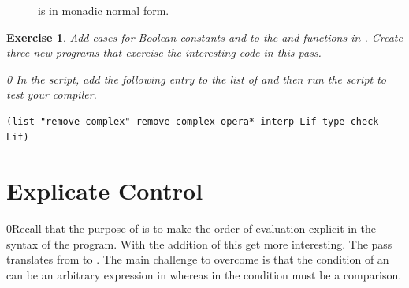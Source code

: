 \documentclass[7x10]{TimesAPriori_MIT}%
\newcommand{\gray}[1]{{\color{gray} #1}}
\def\racketEd{0}
\def\pythonEd{1}
\def\edition{1}
\newcommand{\racket}[1]{{\if\edition\racketEd{#1}\fi}}
\newtheorem{exercise}[theorem]{Exercise}
\begin{document}
\begin{figure}[tp]
\centering
\fbox{
\begin{minipage}{0.96\textwidth}
{\if\edition\racketEd    
\[
\begin{array}{rcl}
Atm &::=& \gray{ \INT{\Int} \MID \VAR{\Var} } \MID \BOOL{\itm{bool}}\\
\Exp &::=& \gray{ \Atm \MID \READ{} } \\
     &\MID& \gray{ \NEG{\Atm} \MID \ADD{\Atm}{\Atm} } \\
     &\MID& \gray{ \LET{\Var}{\Exp}{\Exp} } \\
     &\MID& \UNIOP{\key{not}}{\Atm} \\
      &\MID& \BINOP{\itm{cmp}}{\Atm}{\Atm} \MID \IF{\Exp}{\Exp}{\Exp} \\
\LangIfANF  &::=& \PROGRAM{\code{()}}{\Exp}
\end{array}
\]
\fi}
{\if\edition\pythonEd
\[
\begin{array}{l}
  \LifASTMonadPython \\
  \begin{array}{rcl}
    \LangIfANF  &::=& \PROGRAM{\code{()}}{\Stmt^{*}}
  \end{array}
\end{array}
\]
\fi}
\end{minipage}
}
\caption{\LangIfANF{} is \LangIf{} in monadic normal form.}
\label{fig:Lif-anf-syntax}
\end{figure}


\begin{exercise}\normalfont
%
Add cases for Boolean constants and  to the 
and  functions in .
%
Create three new \LangIf{} programs that exercise the interesting
code in this pass.
%
{\if\edition\racketEd    
In the  script, add the following entry to the
list of  and then run the script to test your compiler.
\begin{lstlisting}
(list "remove-complex" remove-complex-opera* interp-Lif type-check-Lif)
\end{lstlisting}
\fi}
\end{exercise}


\section{Explicate Control}
\label{sec:explicate-control-Lif}

\racket{Recall that the purpose of  is to
  make the order of evaluation explicit in the syntax of the program.
  With the addition of \key{if} this get more interesting.}
%
The  pass translates from \LangIf{} to \LangCIf{}.
%
The main challenge to overcome is that the condition of an 
can be an arbitrary expression in \LangIf{} whereas in \LangCIf{} the
condition must be a comparison.
\end{document}
